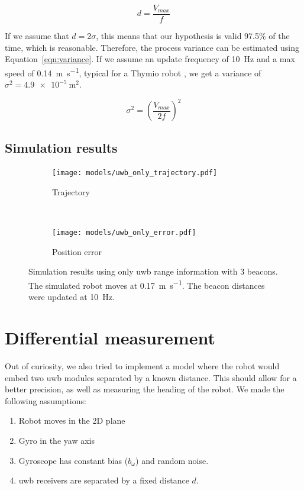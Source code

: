 \documentclass[a4paper, 12pt]{scrreprt}
\begin{document}
\begin{equation}
d = \frac{V_{max}}{f}
\label{eqn:travelled-distance}
\end{equation}

If we assume that \(d = 2 \sigma\), this means that our hypothesis is valid 97.5\% of the time, which is reasonable.
Therefore, the process variance can be estimated using Equation~\ref{eqn:variance}.
If we assume an update frequency of \SI{10}{\hertz} and a max speed of \SI{0.14}{\meter\per\second}, typical for a Thymio robot \cite{thymioweb}, we get a variance of $\sigma^2 = \SI{4.9e-5}{\meter\squared}$.

\begin{equation}
\sigma^2 = \left( \frac{V_{max}}{2 f} \right)^2
\label{eqn:variance}
\end{equation}


\subsection{Simulation results}

\begin{figure}[htpb]
    \centering
    \begin{subfigure}[t]{0.4\textwidth}
        \texttt{[image: models/uwb\_only\_trajectory.pdf]}
        \caption{Trajectory}
    \end{subfigure}%
    ~
    \begin{subfigure}[t]{0.4\textwidth}
        \texttt{[image: models/uwb\_only\_error.pdf]}
        \caption{Position error}
    \end{subfigure}
    \caption{
        Simulation results using only \gls{uwb} range information with 3 beacons.
        The simulated robot moves at \SI{0.17}{\meter\per\second}.
        The beacon distances were updated at \SI{10}{\hertz}.
        \label{fig:uwb_only}
    }
\end{figure}


\section{Differential measurement}

Out of curiosity, we also tried to implement a model where the robot would embed two \gls{uwb} modules separated by a known distance.
This should allow for a better precision, as well as measuring the heading of the robot.
We made the following assumptions:

\begin{enumerate}
    \item Robot moves in the 2D plane
    \item Gyro in the yaw axis
    \item  Gyroscope has constant bias ($b_\omega$) and random noise.
    \item \gls{uwb} receivers are separated by a fixed distance $d$.
\end{enumerate}
\end{document}
